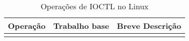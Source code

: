 \begin{table}[]
\centering
\begin{tabular}{|l|l|l|}
  \hline
  \textbf{Operação} &  \textbf{Trabalho base} & \textbf{Breve Descrição} \\ \hline
  \multicolumn{1}{|c|}{} & \multicolumn{1}{c|}{} &                \\ \hline
\end{tabular}
\caption{Operações de IOCTL no Linux}
\label{tab:ops_atomize_linux}
\end{table}
